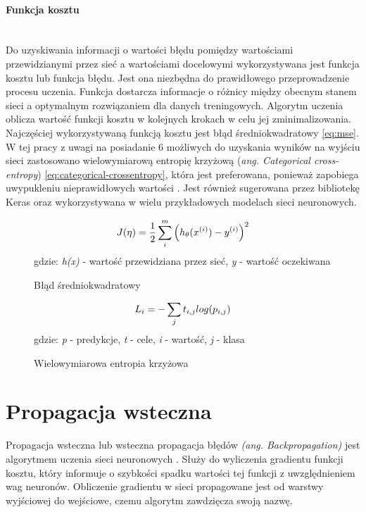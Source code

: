 \paragraph{Funkcja kosztu} \mbox{}\\
Do uzyskiwania informacji o wartości błędu pomiędzy wartościami przewidzianymi przez sieć
a wartościami docelowymi wykorzystywana jest funkcja kosztu lub funkcja błędu.
Jest ona niezbędna do prawidłowego przeprowadzenie procesu uczenia.
Funkcja dostarcza informacje o różnicy między obecnym stanem sieci a optymalnym
rozwiązaniem dla danych treningowych. Algorytm uczenia
oblicza wartość funkcji kosztu w kolejnych krokach w celu jej zminimalizowania.\\
Najczęściej wykorzystywaną funkcją kosztu jest błąd średniokwadratowy \ref{eq:mse}.
W tej pracy z uwagi na posiadanie 6 możliwych do uzyskania wyników na wyjściu sieci
zastosowano wielowymiarową entropię krzyżową (\textit{ang. Categorical cross-entropy}) \ref{eq:categorical-crossentropy},
która jest preferowana, ponieważ zapobiega uwypukleniu nieprawidłowych wartości \cite{whyNotMSE}. Jest również
sugerowana przez bibliotekę Keras oraz wykorzystywana w wielu przykładowych modelach sieci neuronowych.
\begin{figure}[h!]
\renewcommand{\figurename}{Wzór}%
\begin{equation} \label{eq:mse}
J(\eta) = \frac {1}{2} \sum_{i}^{m} \Big(h_{\theta}(x^{(i)}) - y^{(i)} \Big)^2\\
\end{equation}
\centering
gdzie: \textit{h\textsubscript{\straighttheta}(x)} - wartość przewidziana przez sieć, \textit{y} - wartość oczekiwana
\caption{Błąd średniokwadratowy}
\end{figure}
\begin{figure}[h!]
\renewcommand{\figurename}{Wzór}%
\begin{equation} \label{eq:categorical-crossentropy}
L_{i} = - \sum_{j} t_{i,j} log(p_{i,j})\\
\end{equation}
\centering
gdzie: \textit{p} - predykcje, \textit{t} - cele, \textit{i} - wartość, \textit{j} - klasa
\caption{Wielowymiarowa entropia krzyżowa}
\end{figure}

\section{Propagacja wsteczna}
Propagacja wsteczna lub wsteczna propagacja błędów \textit{(ang. Backpropagation)}
jest algorytmem uczenia sieci neuronowych \cite{CS231n_backprop, backprop}.
Służy do wyliczenia gradientu funkcji kosztu, który informuje o szybkości spadku wartości tej funkcji
z uwzględnieniem wag neuronów. Obliczenie gradientu w sieci propagowane
jest od warstwy wyjściowej do wejściowe, czemu algorytm zawdzięcza swoją nazwę.


